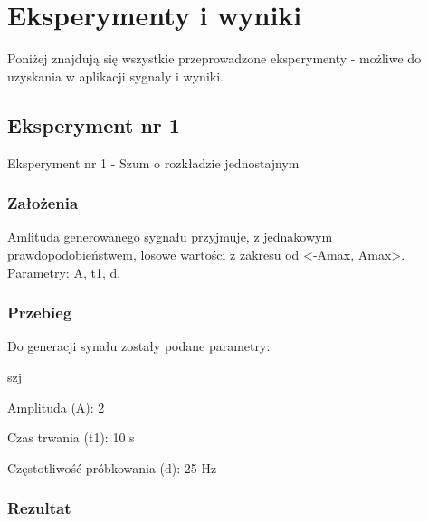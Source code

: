 \documentclass[12pt]{article}
\begin{document}
\section{Eksperymenty i wyniki}

Poniżej znajdują się wszystkie przeprowadzone eksperymenty - możliwe do uzyskania w aplikacji sygnaly i wyniki. 


\subsection{Eksperyment nr 1}

Eksperyment nr 1 - Szum o rozkładzie jednostajnym\\


\subsubsection{Założenia}
Amlituda generowanego sygnału przyjmuje, z jednakowym prawdopodobieństwem, losowe wartości z zakresu od <-Amax, Amax>.
Parametry: A, t1, d.
\subsubsection{Przebieg}
Do generacji synału zostały podane parametry:

\begin{labeling}{szj}
\item [Amplituda (A):] 2
\item [Czas trwania (t1):] 10 s
\item [Częstotliwość próbkowania (d): ] 25 Hz
\end{labeling}

\subsubsection{Rezultat}
\end{document}
